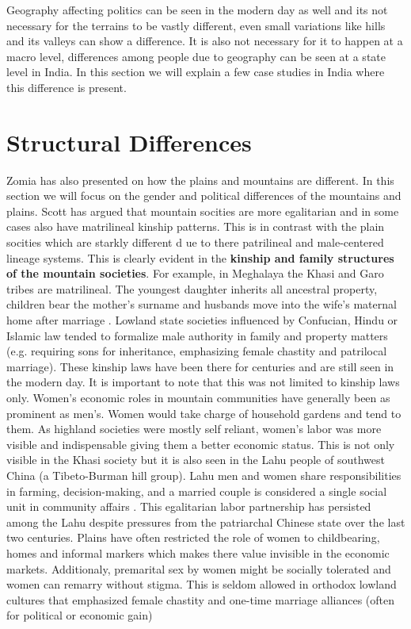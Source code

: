 Geography affecting politics can be seen in the modern day as well and its not necessary for the terrains to be vastly different, even small variations like hills and its valleys can show a difference. It is also not necessary for it to happen at a macro level, differences among people due to geography can be seen at a state level in India. In this section we will explain a few case studies in India where this difference is present. 

\section{Structural Differences}

Zomia has also presented on how the plains and mountains are different. In this section we will focus on the gender and political differences of the mountains and plains. Scott has argued that mountain socities are more egalitarian and in some cases also have matrilineal kinship patterns. This is in contrast with the plain socities which are starkly different d ue to there patrilineal and male-centered lineage systems. This is clearly evident in the \textbf{kinship and family structures of the mountain societies}. For example, in Meghalaya the Khasi and Garo tribes are matrilineal. The youngest daughter inherits all ancestral property, children bear the mother's surname and husbands move into the wife’s maternal home after marriage \citep{Allen_2012}. Lowland state societies influenced by Confucian, Hindu or Islamic law tended to formalize male authority in family and property matters (e.g. requiring sons for inheritance, emphasizing female chastity and patrilocal marriage). These kinship laws have been there for centuries and are still seen in the modern day. It is important to note that this was not limited to kinship laws only. Women’s economic roles in mountain communities have generally been as prominent as men’s. Women would take charge of household gardens and tend to them. As highland societies were mostly self reliant, women's labor was more visible and indispensable giving them a better economic status. This is not only visible in the Khasi society but it is also seen in the Lahu people of southwest China (a Tibeto-Burman hill group). Lahu men and women share responsibilities in farming, decision-making,  and a married couple is considered a single social unit in community affairs \citep{Du_2015}. This egalitarian labor partnership has persisted among the Lahu despite pressures from the patriarchal Chinese state over the last two centuries. Plains have often restricted the role of women to childbearing, homes and informal markers which makes there value invisible in the economic markets. Additionaly, premarital sex by women might be socially tolerated and women can remarry without stigma. This is seldom allowed in orthodox lowland cultures that emphasized female chastity and one-time marriage alliances (often for political or economic gain)
